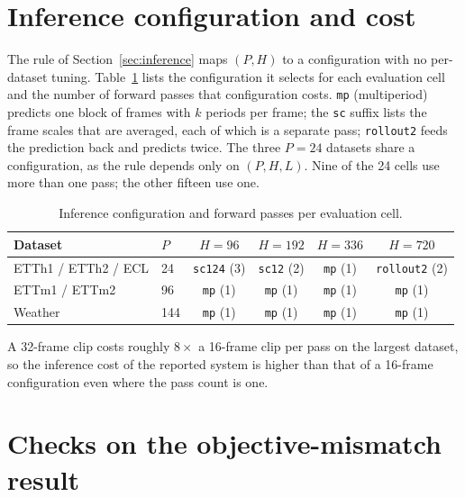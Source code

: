 \section{Inference configuration and cost}
\label{app:inference}

The rule of Section~\ref{sec:inference} maps $(P, H)$ to a configuration with no per-dataset tuning.
Table~\ref{tab:passes} lists the configuration it selects for each evaluation cell and the number of
forward passes that configuration costs. \texttt{mp} (multiperiod) predicts one block of frames with $k$
periods per frame; the \texttt{sc} suffix lists the frame scales that are averaged, each of which is
a separate pass; \texttt{rollout2} feeds the prediction back and predicts twice. The three $P{=}24$ datasets share a configuration, as the rule
depends only on $(P,H,L)$. Nine of the 24 cells use more than one pass; the other fifteen use one.

\begin{table}[h]
\caption{Inference configuration and forward passes per evaluation cell.}
\label{tab:passes}
\begin{center}
\setlength{\tabcolsep}{5pt}
\footnotesize
\begin{tabular}{llcccc}
\toprule
Dataset & $P$ & $H{=}96$ & $H{=}192$ & $H{=}336$ & $H{=}720$ \\
\midrule
ETTh1 / ETTh2 / ECL & 24 & \texttt{sc124} (3) & \texttt{sc12} (2) & \texttt{mp} (1) & \texttt{rollout2} (2) \\
ETTm1 / ETTm2 & 96 & \texttt{mp} (1) & \texttt{mp} (1) & \texttt{mp} (1) & \texttt{mp} (1) \\
Weather & 144 & \texttt{mp} (1) & \texttt{mp} (1) & \texttt{mp} (1) & \texttt{mp} (1) \\
\bottomrule
\end{tabular}
\end{center}
\end{table}

A 32-frame clip costs roughly $8\times$ a 16-frame clip per pass on the largest dataset, so the
inference cost of the reported system is higher than that of a 16-frame configuration even where the
pass count is one.

\section{Checks on the objective-mismatch result}
\label{app:diagnosis}

